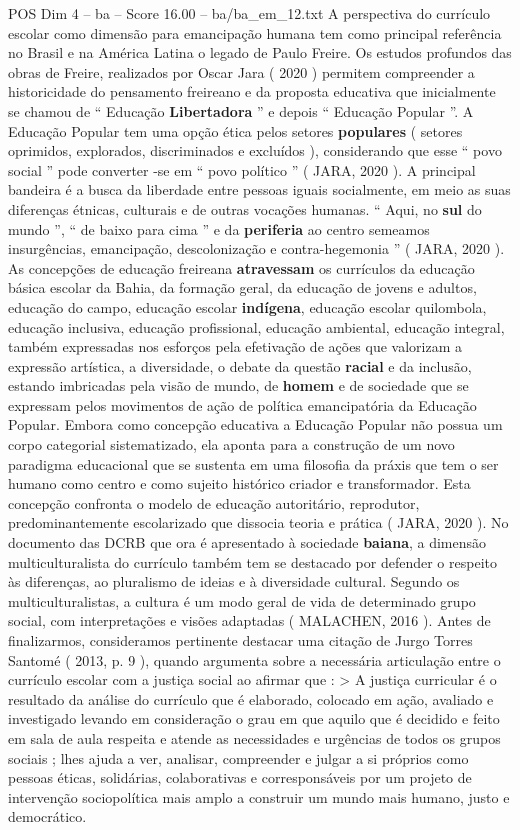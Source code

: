 \begin{textsample}{POS Dim 4 – ba – Score 16.00 – ba/ba\_em\_12.txt}
A perspectiva do currículo escolar como dimensão para emancipação humana tem como principal referência no Brasil e na América Latina o legado de Paulo Freire.
Os estudos profundos das obras de Freire, realizados por Oscar Jara ( 2020 ) permitem compreender a historicidade do pensamento freireano e da proposta educativa que inicialmente se chamou de “ Educação \textbf{Libertadora} ” e depois “ Educação Popular ”.
A Educação Popular tem uma opção ética pelos setores \textbf{populares} ( setores oprimidos, explorados, discriminados e excluídos ), considerando que esse “ povo social ” pode converter -se em “ povo político ” ( JARA, 2020 ).
A principal bandeira é a busca da liberdade entre pessoas iguais socialmente, em meio as suas diferenças étnicas, culturais e de outras vocações humanas. “ Aqui, no \textbf{sul} do mundo ”, “ de baixo para cima ” e da \textbf{periferia} ao centro semeamos insurgências, emancipação, descolonização e contra-hegemonia ” ( JARA, 2020 ).
As concepções de educação freireana \textbf{atravessam} os currículos da educação básica escolar da Bahia, da formação geral, da educação de jovens e adultos, educação do campo, educação escolar \textbf{indígena}, educação escolar quilombola, educação inclusiva, educação profissional, educação ambiental, educação integral, também expressadas nos esforços pela efetivação de ações que valorizam a expressão artística, a diversidade, o debate da questão \textbf{racial} e da inclusão, estando imbricadas pela visão de mundo, de \textbf{homem} e de sociedade que se expressam pelos movimentos de ação de política emancipatória da Educação Popular.
Embora como concepção educativa a Educação Popular não possua um corpo categorial sistematizado, ela aponta para a construção de um novo paradigma educacional que se sustenta em uma filosofia da práxis que tem o ser humano como centro e como sujeito histórico criador e transformador.
Esta concepção confronta o modelo de educação autoritário, reprodutor, predominantemente escolarizado que dissocia teoria e prática ( JARA, 2020 ).
No documento das DCRB que ora é apresentado à sociedade \textbf{baiana}, a dimensão multiculturalista do currículo também tem se destacado por defender o respeito às diferenças, ao pluralismo de ideias e à diversidade cultural.
Segundo os multiculturalistas, a cultura é um modo geral de vida de determinado grupo social, com interpretações e visões adaptadas ( MALACHEN, 2016 ).
Antes de finalizarmos, consideramos pertinente destacar uma citação de Jurgo Torres Santomé ( 2013, p. 9 ), quando argumenta sobre a necessária articulação entre o currículo escolar com a justiça social ao afirmar que : > A justiça curricular é o resultado da análise do currículo que é elaborado, colocado em ação, avaliado e investigado levando em consideração o grau em que aquilo que é decidido e feito em sala de aula respeita e atende as necessidades e urgências de todos os grupos sociais ; lhes ajuda a ver, analisar, compreender e julgar a si próprios como pessoas éticas, solidárias, colaborativas e corresponsáveis por um projeto de intervenção sociopolítica mais amplo a construir um mundo mais humano, justo e democrático.

\end{textsample}
